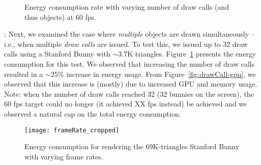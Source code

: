 \begin{figure}[t]
    \centering
    \vspace{-1ex}
    \vspace{-2ex}
    \caption{Energy consumption rate with varying number of draw calls 
            (and thus objects) at 60 fps.}
    \label{fig:drawCall}
\end{figure}



:
%
%
Next, we examined the case where \textit{multiple} objects are drawn simultaneously -- i.e., when multiple \emph{draw calls} are issued. To test this, we issued up to 32 draw calls using a Stanford Bunny with 
$\sim$3.7K triangles. Figure~\ref{fig:drawCall} presents the energy consumption for this test. We observed that increasing the number of draw calls resulted in a $\sim$25\% increase in energy usage. From Figure~\ref{fig:drawCall-gpu}, we observed that this increase is (mostly) due to increased GPU and memory usage. Note: when the number of draw calls reached 32 (32 bunnies on the screen), the 60 fps target could no longer (it achieved XX fps instead) be achieved and we observed a natural cap on the total energy consumption.

%
%


%


\begin{figure}[t]
    \centering
    \vspace{-2ex}
        \texttt{[image: frameRate\_cropped]}
    \vspace{-2ex}
    \caption{Energy consumption for rendering the 69K-triangles Stanford Bunny
            with varying frame rates.}
    \label{fig:frame_rate}
\end{figure}

